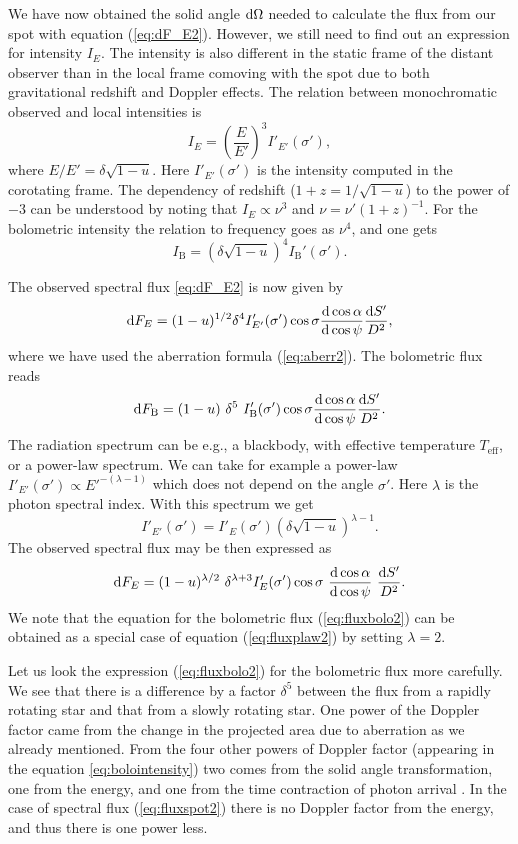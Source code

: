 \documentclass{wihuri}
\def\be{\begin{equation}}
\def\ee{\end{equation}}
\def\d{{\rm d}}
\def\Dop{\delta}
\def\bolo{\mathrm{B}}
\def\ene{E}%
\begin{document}
We have now obtained the solid angle $\d\Omega$ needed to calculate the flux from our spot with equation (\ref{eq:dF_E2}). However, we still need to find out an expression for intensity $I_{\ene}$. The intensity is also different in the static frame of the distant observer than in the local frame comoving with the spot due to both gravitational redshift and Doppler effects. The relation between monochromatic observed and local intensities is \cite{mtw} \cite{rybicki}%
\be
I_{\ene} = \left (\frac{E}{E'}\right )^3 I'_{\ene'} (\sigma'),
\ee
where $E/E'=\Dop \sqrt{1-u}$. Here $I'_{\ene'}(\sigma')$ is the intensity computed in the corotating frame. The dependency of redshift ($1+z = 1/\sqrt{1-u}$) to the power of $-3$ can be understood by noting that $I_{\ene} \propto \nu^{3}$ and $\nu = \nu'(1+z)^{-1}$.
For the bolometric intensity the relation to frequency goes as $\nu^{4}$, and one gets
\be \label{eq:bolointensity}
I_{\bolo}= \left (\Dop \sqrt{1-u} \right )^4 I_{\bolo}'(\sigma') .
\ee

The observed spectral flux \eqref{eq:dF_E2} is now given by
\be \label{eq:fluxspot2}
\d F_{\ene}=(1-u)^{1/2} \Dop^{4} I'_{\ene'}(\sigma') \cos\sigma
\frac{\d \cos\alpha}{\d\cos\psi}
 \frac{\d S'}{D^2} ,
\ee
where we have used the aberration formula (\ref{eq:aberr2}).
The bolometric flux reads
\be  \label{eq:fluxbolo2}
\d F_{\bolo}= (1-u)\ \Dop^5 \
I_{\bolo}'(\sigma')  \cos\sigma \frac{\d\cos\alpha}{\d\cos\psi} \frac{\d S'}{D^2} .
\ee
The radiation spectrum can be e.g., a blackbody, with effective temperature $T_{\mathrm{eff}}$, or a power-law spectrum. We can take for example a power-law $I'_{\ene'}(\sigma') \propto E '^{-(\lambda-1)}$ which does not depend on the angle $\sigma'$. Here $\lambda$ is the photon spectral index. With this spectrum we get
\be \label{eq:int_trans2}
I'_{\ene'}(\sigma') = I'_{\ene}(\sigma')
\left( \Dop \sqrt{1-u} \right)^{\lambda-1} .
\ee
The observed spectral flux %
may be then expressed as
\be\label{eq:fluxplaw2}
\d F_{\ene}= (1-u)^{\lambda/2}\ \Dop^{\lambda+3} I'_{\ene}(\sigma')
\cos\sigma\ \frac{\d\cos\alpha}{\d\cos\psi}\ \frac{\d S'}{D^2}.
\ee
We note that the equation for the bolometric flux (\ref{eq:fluxbolo2})
can be obtained as a special case of equation (\ref{eq:fluxplaw2}) by setting $\lambda=2$. 

Let us look the expression (\ref{eq:fluxbolo2}) for the bolometric flux more carefully. We see that there is a difference by a factor $\Dop^5$ between the flux from a rapidly rotating star and that from a slowly rotating star. One power of the Doppler factor came from the change in the projected area due to aberration as we already mentioned. From the four other powers of Doppler factor (appearing in the equation \ref{eq:bolointensity}) two comes from the solid angle transformation, one from the energy, and one from the time contraction of photon arrival \cite{rybicki}. %
In the case of spectral flux (\ref{eq:fluxspot2}) there is no Doppler factor from the energy, and thus there is one power less.
\end{document}
